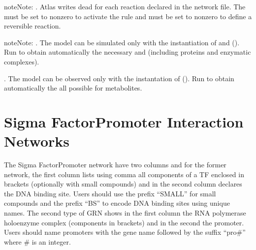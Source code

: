 \documentclass[letterpaper,10pt,english]{sphinxmanual}
\begin{document}
\begin{sphinxadmonition}{note}{Note:}
. Atlas writes dead  for each
reaction declared in the network file. The 
must be set to non\sphinxhyphen{}zero to activate the rule and 
must be set to non\sphinxhyphen{}zero to define a reversible reaction.
\end{sphinxadmonition}

\begin{sphinxadmonition}{note}{Note:}
. The model can be simulated only with the instantiation of
 and  ().
Run  to obtain
automatically the necessary  and  (including
proteins and enzymatic complexes).

. The model can be observed only with the instantation of
 ().
Run  to obtain
automatically the all possible  for metabolites.
\end{sphinxadmonition}


\section{Sigma Factor\sphinxhyphen{}Promoter Interaction Networks}
\label{\detokenize{NetSFsPromoters:sigma-factor-promoter-interaction-networks}}\label{\detokenize{NetSFsPromoters:net-sfspromoters}}\label{\detokenize{NetSFsPromoters::doc}}
The Sigma Factor\sphinxhyphen{}Promoter network have two columns and for the former network, the first column lists using comma all components of a TF enclosed in brackets (optionally with small compounds) and in the second column declares the DNA binding site. Users should use the prefix “SMALL\sphinxhyphen{}” for small compounds and the prefix “BS\sphinxhyphen{}” to encode DNA binding sites using unique names. The second type of GRN shows in the first column the RNA polymerase holoenzyme complex (components in brackets) and in the second the promoter. Users should name promoters with the gene name followed by the suffix “\sphinxhyphen{}pro\#” where \# is an integer.
\end{document}
